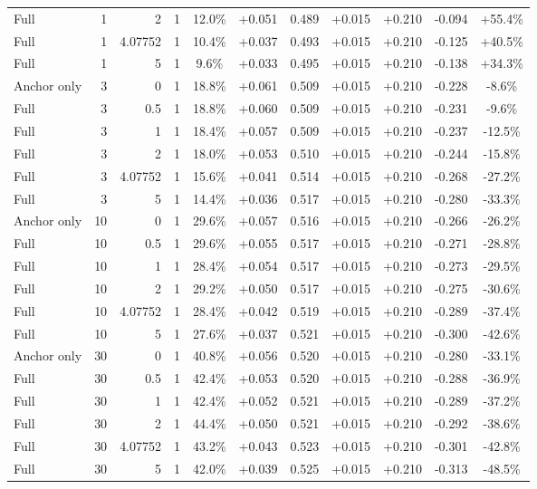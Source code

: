 \begin{table}[htbp]
\begin{tabular}{lrrrccccccc}
Full & 1 & 2 & 1 & 12.0\% & +0.051 & 0.489 & +0.015 & +0.210 & -0.094 & +55.4\% \\
Full & 1 & 4.07752 & 1 & 10.4\% & +0.037 & 0.493 & +0.015 & +0.210 & -0.125 & +40.5\% \\
Full & 1 & 5 & 1 & 9.6\% & +0.033 & 0.495 & +0.015 & +0.210 & -0.138 & +34.3\% \\
Anchor only & 3 & 0 & 1 & 18.8\% & +0.061 & 0.509 & +0.015 & +0.210 & -0.228 & -8.6\% \\
Full & 3 & 0.5 & 1 & 18.8\% & +0.060 & 0.509 & +0.015 & +0.210 & -0.231 & -9.6\% \\
Full & 3 & 1 & 1 & 18.4\% & +0.057 & 0.509 & +0.015 & +0.210 & -0.237 & -12.5\% \\
Full & 3 & 2 & 1 & 18.0\% & +0.053 & 0.510 & +0.015 & +0.210 & -0.244 & -15.8\% \\
Full & 3 & 4.07752 & 1 & 15.6\% & +0.041 & 0.514 & +0.015 & +0.210 & -0.268 & -27.2\% \\
Full & 3 & 5 & 1 & 14.4\% & +0.036 & 0.517 & +0.015 & +0.210 & -0.280 & -33.3\% \\
Anchor only & 10 & 0 & 1 & 29.6\% & +0.057 & 0.516 & +0.015 & +0.210 & -0.266 & -26.2\% \\
Full & 10 & 0.5 & 1 & 29.6\% & +0.055 & 0.517 & +0.015 & +0.210 & -0.271 & -28.8\% \\
Full & 10 & 1 & 1 & 28.4\% & +0.054 & 0.517 & +0.015 & +0.210 & -0.273 & -29.5\% \\
Full & 10 & 2 & 1 & 29.2\% & +0.050 & 0.517 & +0.015 & +0.210 & -0.275 & -30.6\% \\
Full & 10 & 4.07752 & 1 & 28.4\% & +0.042 & 0.519 & +0.015 & +0.210 & -0.289 & -37.4\% \\
Full & 10 & 5 & 1 & 27.6\% & +0.037 & 0.521 & +0.015 & +0.210 & -0.300 & -42.6\% \\
Anchor only & 30 & 0 & 1 & 40.8\% & +0.056 & 0.520 & +0.015 & +0.210 & -0.280 & -33.1\% \\
Full & 30 & 0.5 & 1 & 42.4\% & +0.053 & 0.520 & +0.015 & +0.210 & -0.288 & -36.9\% \\
Full & 30 & 1 & 1 & 42.4\% & +0.052 & 0.521 & +0.015 & +0.210 & -0.289 & -37.2\% \\
Full & 30 & 2 & 1 & 44.4\% & +0.050 & 0.521 & +0.015 & +0.210 & -0.292 & -38.6\% \\
Full & 30 & 4.07752 & 1 & 43.2\% & +0.043 & 0.523 & +0.015 & +0.210 & -0.301 & -42.8\% \\
Full & 30 & 5 & 1 & 42.0\% & +0.039 & 0.525 & +0.015 & +0.210 & -0.313 & -48.5\% \\

\end{tabular}
\end{table}
